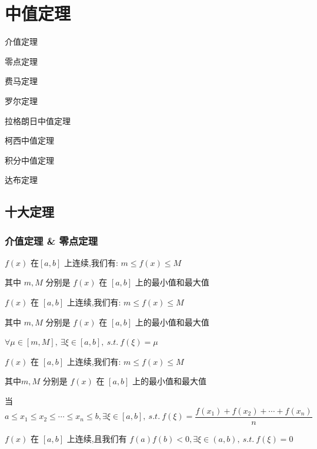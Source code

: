 \chapter{中值定理}
\begin{introduction}
	\item 介值定理
	\item 零点定理
	\item 费马定理
	\item 罗尔定理
	\item 拉格朗日中值定理
	\item 柯西中值定理
	\item 积分中值定理
	\item 达布定理
\end{introduction}
\section{十大定理}
\subsection{介值定理 \& 零点定理}

\begin{theorem}[有界和最值定理]

	$f(x)$ 在$[a,b]$ 上连续,我们有: $m\leq f(x)\leq M$

	其中 $m,M$ 分别是 $f(x)$ 在 $[a,b]$ 上的最小值和最大值
\end{theorem}
\begin{theorem}[介值定理]

	$f(x)$ 在 $[a,b]$ 上连续,我们有: $m\leq f(x)\leq M$

	其中 $m,M$ 分别是 $f(x)$ 在 $[a,b]$ 上的最小值和最大值

	$\forall \mu\in [m,M],\ \exists \xi\in[a,b],\ s.t.\ f(\xi)=\mu$
\end{theorem}
\begin{theorem}[平均值定理]

	$f(x)$ 在 $[a,b]$ 上连续,我们有: $m\leq f(x)\leq M$

	其中$m,M$ 分别是 $f(x)$ 在 $[a,b]$ 上的最小值和最大值

	当 $a\leq x_{1}\leq x_{2}\leq\cdots\leq x_{n}\leq b,\exists \xi\in[a,b],\ s.t.\ f(\xi)=\dfrac{f(x_{1})+f(x_{2})+\cdots+f(x_{n})}{n}$
\end{theorem}
\begin{theorem}[零点定理]

	$f(x)$ 在 $[a,b]$ 上连续,且我们有 $f(a)f(b)<0,\exists \xi\in(a,b),\ s.t.\ f(\xi)=0$
\end{theorem}

